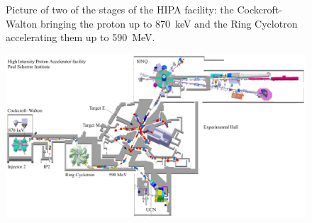 \begin{refsection}
\begin{figure}
            \caption[HIPA: CW and Ring Cyclotron]{Picture of two of the stages of the HIPA facility: the Cockcroft-Walton bringing the proton up to \SI{870}{keV} and the Ring Cyclotron accelerating them up to \SI{590}{MeV}.}
        \end{figure}
        \begin{figure}
            \centering
            \includegraphics[width = \textwidth]{Figures/Introduction/PSI_HIPA.png}

\end{figure}
\end{refsection}
